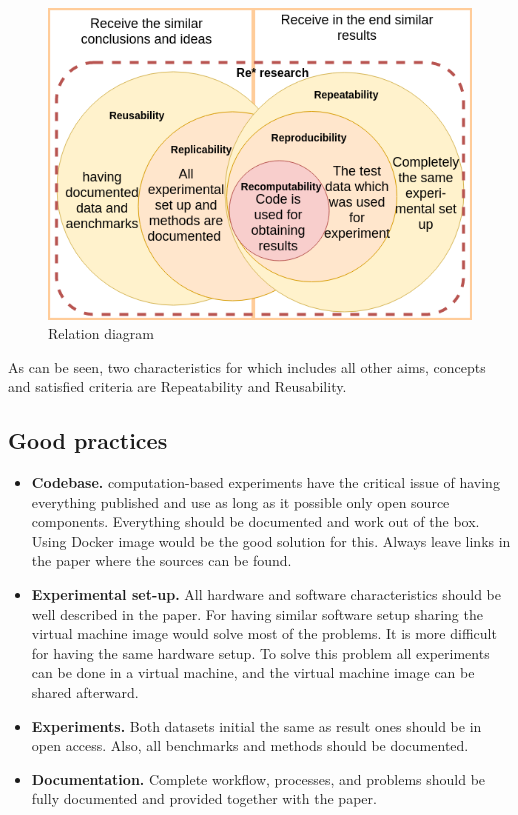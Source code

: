 \documentclass{vldb}
\begin{document}
\begin{figure}[h!]
  \includegraphics[scale=0.45]{fig/relationdiagram.png}
  \caption{Relation diagram}
  \label{fig:relationdiagram}
\end{figure}
As can be seen, two characteristics for which includes all other aims, concepts and satisfied criteria are Repeatability and Reusability.
\subsection{Good practices}
\begin{itemize}
    \item \textbf{Codebase.} computation-based experiments have the critical issue of having everything published and use as long as it possible only open source components. Everything should be documented and work out of the box. Using Docker image would be the good solution for this. Always leave links in the paper where the sources can be found.
    \item \textbf{Experimental set-up.} All hardware and software characteristics should be well described in the paper. For having similar software setup sharing the virtual machine image would solve most of the problems. It is more difficult for having the same hardware setup. To solve this problem all experiments can be done in a virtual machine, and the virtual machine image can be shared afterward. 
    \item \textbf{Experiments.}  Both datasets initial the same as result ones should be in open access. Also, all benchmarks and methods should be documented. 
    \item \textbf{Documentation.} Complete workflow, processes, and problems should be fully documented and provided together with the paper.
\end{itemize}
\end{document}
